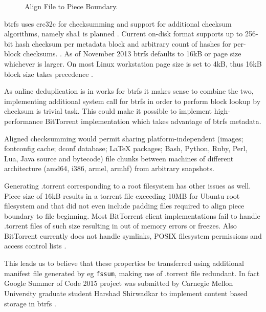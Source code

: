 \documentclass[a4paper,11pt]{kth-mag}
\begin{document}
\begin{figure}[!htb]
\centering
\scalebox{0.35}{}
\caption{Align File to Piece Boundary.}
\label{fig:torrent-multifile-aligned}
\end{figure}


\acrshort{btrfs} uses \acrshort{crc32c} for checksumming and support for additional
checksum algorithms, namely \acrshort{sha1} is planned
\cite{btrfs-checksumming-algorithms}.
Current on-disk format supports up to 256-bit hash checksum per
metadata block and arbitrary count of hashes for per-block checksums.
\cite{what-checksum-function-does-btrfs-use}.
As of November 2013 \acrshort{btrfs} defaults to 16kB or page size
whichever is larger.
On most Linux workstation page size is set to 4kB, thus 16kB block
size takes precedence \cite{btrfs-blocksize-to-16k}.

As online deduplication is in works for \acrshort{btrfs} it makes sense to
combine the two, implementing additional system call for \acrshort{btrfs} in
order to perform block lookup by checksum is trivial task.
This could make it possible to implement high-performance
BitTorrent implementation which takes advantage of \acrshort{btrfs} metadata.

Aligned checksumming would permit sharing platform-independent
(images; fontconfig cache; dconf database; LaTeX packages;
Bash, Python, Ruby, Perl, Lua, Java source and bytecode)
file chunks between machines of different architecture (amd64, i386, armel, armhf)
from arbitrary snapshots.

Generating .torrent corresponding to a root filesystem
has other issues as well.
Piece size of 16kB results in a torrent file
exceeding 10MB for Ubuntu root filesystem and that did not even
include padding files required to align piece boundary to file beginning.
Most BitTorrent client implementations fail to handle .torrent
files of such size resulting in out of memory errors or freezes.
Also BitTorrent currently does not handle symlinks,
POSIX filesystem permissions and access control lists
\cite{posix-acl}.

This leads us to believe that these properties be transferred
using additional manifest file generated by eg \lstinline!fssum!,
making use of .torrent file redundant.
In fact Google Summer of Code 2015 project
\cite{btrfs-content-storage-mode}
was submitted by
Carnegie Mellon University graduate student Harshad Shirwadkar
to implement content based storage in \acrshort{btrfs}
\cite{content-based-storage}.
\end{document}
